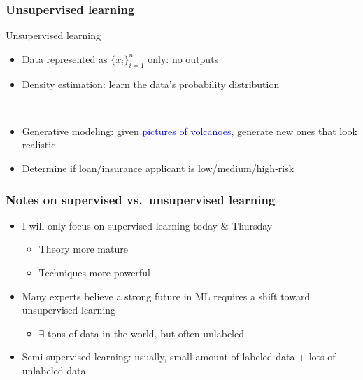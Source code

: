 \begin{frame}[t]
    \frametitle{Unsupervised learning}
    \begin{block}{Unsupervised learning}
        \begin{itemize}
            \item Data represented as $\{x_i\}_{i=1}^n$ only: no outputs
            \item \alert{Density estimation}: learn the data's probability distribution
        \end{itemize}
    \end{block}

     \\[1ex]

    \begin{itemize}
        \item<4-> Generative modeling: given \textcolor<5->{blue}{pictures of volcanoes}, generate \textcolor<5->{Green4}{new ones that look realistic}
        \item<6-> Determine if loan/insurance applicant is low/medium/high-risk
    \end{itemize}

    \hfill
\end{frame}

\begin{frame}
    \frametitle{Notes on supervised vs.~unsupervised learning}

    \begin{itemize}
        \item I will only focus on supervised learning today \& Thursday
        \begin{itemize}
            \item Theory more mature
            \item Techniques more powerful
        \end{itemize}
        \item Many experts believe a strong future in ML requires a shift toward unsupervised learning
        \begin{itemize}
            \item $\exists$ tons of data in the world, but often unlabeled
        \end{itemize}
        \item Semi-supervised learning: usually, small amount of labeled data + lots of unlabeled data
    \end{itemize}
\end{frame}

